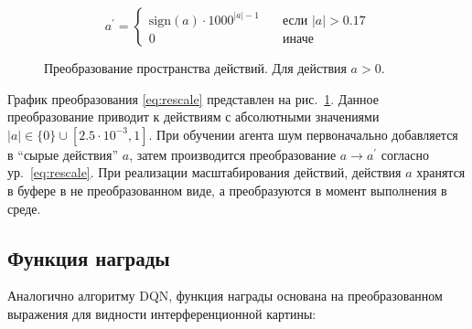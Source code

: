 \begin{equation}
a^{\prime} =
   \begin{cases}
    {\mathrm{sign}}(a) \cdot 1000^{|a| - 1}  & \quad \text{если $|a| > 0.17$} 
    \\
    0  & \quad \text{иначе}
  \end{cases}
\label{eq:rescale}
\end{equation}

\begin{figure}[ht]
\caption{Преобразование пространства действий. Для действия $a > 0$.}
\label{fig:rescale}
\end{figure}

График преобразования \eqref{eq:rescale} представлен на рис.~\ref{fig:rescale}. Данное преобразование приводит к действиям с абсолютными значениями $|a|\in\{0\}\cup[2.5 \cdot 10^{-3}, 1]$. При обучении агента шум первоначально добавляется в ``сырые действия'' $a$, затем производится преобразование $a \to a^{\prime}$ согласно ур.~\eqref{eq:rescale}. При реализации масштабирования действий, действия $a$ хранятся в буфере в не преобразованном виде, а преобразуются в момент выполнения в среде. 

\subsection{Функция награды}

Аналогично алгоритму DQN, функция награды основана на преобразованном выражения для видности интерференционной картины:

